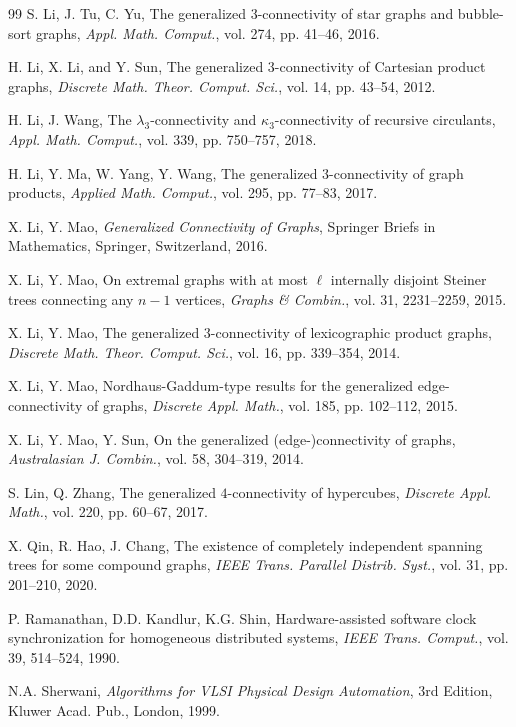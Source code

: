 \documentclass[final]{dmtcs-episciences}
\begin{document}
\begin{thebibliography}{99}
S. Li, J. Tu, C. Yu, The generalized $3$-connectivity of star graphs
and bubble-sort graphs, \emph{Appl. Math. Comput.}, vol. 274, pp.
41--46, 2016.

H. Li, X. Li, and Y. Sun, The generalized $3$-connectivity of
Cartesian product graphs, \emph{Discrete Math. Theor. Comput. Sci.},
vol. 14, pp. 43--54, 2012.

H. Li, J. Wang, The $\lambda_3$-connectivity and
$\kappa_3$-connectivity of recursive circulants, \emph{Appl. Math.
Comput.}, vol. 339, pp. 750--757, 2018.


H. Li, Y. Ma, W. Yang, Y. Wang, The generalized $3$-connectivity of
graph products, \emph{Applied Math. Comput.}, vol. 295, pp. 77--83,
2017.

X. Li, Y. Mao, \emph{Generalized Connectivity of Graphs}, Springer
Briefs in Mathematics, Springer, Switzerland, 2016.


X. Li, Y. Mao, On extremal graphs with at most $\ell$ internally
disjoint Steiner trees connecting any $n-1$ vertices, \emph{Graphs
\& Combin.}, vol. 31, 2231--2259, 2015.

X. Li, Y. Mao, The generalized $3$-connectivity of lexicographic
product graphs, \emph{Discrete Math. Theor. Comput. Sci.}, vol. 16,
pp. 339--354, 2014.

X. Li, Y. Mao, Nordhaus-Gaddum-type results for the generalized
edge-connectivity of graphs, \emph{Discrete Appl. Math.}, vol. 185,
pp. 102--112, 2015.

X. Li, Y. Mao, Y. Sun, On the generalized (edge-)connectivity of
graphs, \emph{Australasian J. Combin.}, vol. 58, 304--319, 2014.

S. Lin, Q. Zhang, The generalized $4$-connectivity of hypercubes,
\emph{Discrete Appl. Math.}, vol. 220, pp. 60--67, 2017.

X. Qin, R. Hao, J. Chang, The existence of completely independent
spanning trees for some compound graphs, \emph{IEEE Trans. Parallel
Distrib. Syst.}, vol. 31, pp. 201--210, 2020.

P. Ramanathan, D.D. Kandlur, K.G. Shin, Hardware-assisted software
clock synchronization for homogeneous distributed systems,
\emph{IEEE Trans. Comput.}, vol. 39, 514--524, 1990.

N.A. Sherwani, \emph{Algorithms for VLSI Physical Design Automation}, 3rd
Edition, Kluwer Acad. Pub., London, 1999.


\end{thebibliography}
\end{document}
